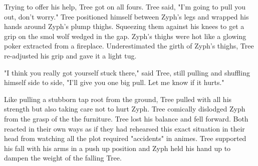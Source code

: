 Trying to offer his help, Tree got on all fours. Tree said, "I'm going to pull you out, don't worry." Tree positioned himself between Zyph's legs and wrapped his hands around Zyph's plump thighs. Squeezing them against his knees to get a grip on the smol wolf wedged in the gap. Zyph's thighs were hot like a  glowing poker extracted from a fireplace. Underestimated the girth of Zyph's thighs, Tree re-adjusted his grip and gave it a light tug.

"I think you really got yourself stuck there," said Tree, still pulling and shuffling himself side to side, "I'll give you one big pull. Let me know if it hurts."

Like pulling a stubborn tap root from the ground, Tree pulled with all his strength but also taking care not to hurt Zyph. Tree comically dislodged Zyph from the grasp of the the furniture. Tree lost his balance and fell forward. Both reacted in their own ways as if they had rehearsed this exact situation in their head from watching all the plot required "accidents" in animes. Tree supported his fall with his arms in a push up position and Zyph held his hand up to dampen the weight of the falling Tree.